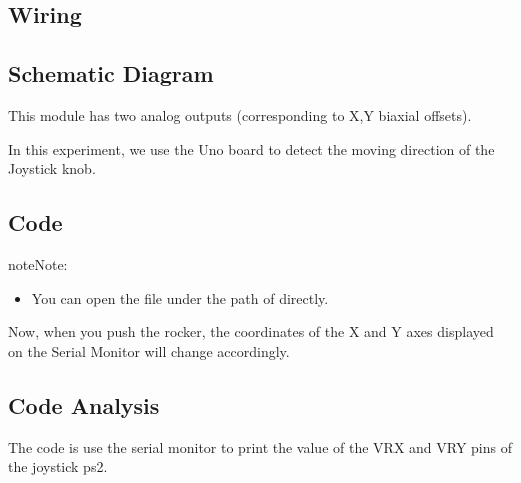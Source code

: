 \documentclass[a4paper,11pt,english]{sphinxmanual}
\begin{document}
\subsection{Wiring}
\label{\detokenize{Basic_Project/Joystick_Module:wiring}}


\subsection{Schematic Diagram}
\label{\detokenize{Basic_Project/Joystick_Module:schematic-diagram}}
\sphinxAtStartPar
This module has two analog outputs (corresponding to X,Y biaxial offsets).

\sphinxAtStartPar
In this experiment, we use the Uno board to detect the moving direction of the Joystick knob.



\subsection{Code}
\label{\detokenize{Basic_Project/Joystick_Module:code}}
\begin{sphinxadmonition}{note}{Note:}\begin{itemize}
\item {} 
\sphinxAtStartPar
You can open the file  under the path of  directly.

\end{itemize}
\end{sphinxadmonition}

\sphinxAtStartPar
Now, when you push the rocker, the coordinates of the X and Y axes displayed on the Serial Monitor will change accordingly.


\subsection{Code Analysis}
\label{\detokenize{Basic_Project/Joystick_Module:code-analysis}}
\sphinxAtStartPar
The code is use the serial monitor to print the value of the VRX and VRY pins of the joystick ps2.
\end{document}
